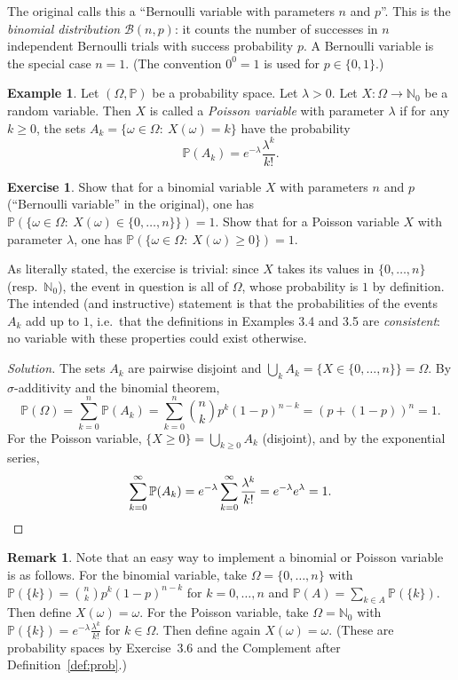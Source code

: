 \documentclass[11pt,a4paper]{article}
\numberwithin{equation}{section}
\newcommand{\N}{\mathbb{N}}
\newcommand{\PP}{\mathbb{P}}
\theoremstyle{plain}
\theoremstyle{definition}
\newtheorem{example}[theorem]{Example}
\newtheorem{exercise}[theorem]{Exercise}
\newtheorem{remark}[theorem]{Remark}
\theoremstyle{plain}
\theoremstyle{definition}
\newenvironment{solution}{\begin{proof}[Solution]}{\end{proof}}
\begin{document}
\begin{correction}[(Ex.~3.4)]
The original calls this a ``Bernoulli variable with parameters $n$ and $p$''. This is the
\emph{binomial distribution} $\mathcal B(n,p)$: it counts the number of successes in $n$
independent Bernoulli trials with success probability $p$. A Bernoulli variable is the
special case $n=1$. (The convention $0^0=1$ is used for $p\in\{0,1\}$.)
\end{correction}

\begin{example}
Let $(\Omega,\PP)$ be a probability space. Let $\lambda>0$. Let $X:\Omega\to\N_0$ be a
random variable. Then $X$ is called a \emph{Poisson variable} with parameter $\lambda$ if
for any $k\geqslant0$, the sets $A_k=\{\omega\in\Omega:\ X(\omega)=k\}$ have the probability
\[
\PP(A_k)=e^{-\lambda}\frac{\lambda^k}{k!}.
\]
\end{example}

\begin{exercise}
Show that for a binomial variable $X$ with parameters $n$ and $p$ (``Bernoulli variable'' in
the original), one has $\PP(\{\omega\in\Omega:\ X(\omega)\in\{0,\dots,n\}\})=1$.
Show that for a Poisson variable $X$ with parameter $\lambda$, one has
$\PP(\{\omega\in\Omega:\ X(\omega)\geqslant0\})=1$.
\end{exercise}

\begin{correction}[(Ex.~3.6)]
As literally stated, the exercise is trivial: since $X$ takes its values in $\{0,\dots,n\}$
(resp.\ $\N_0$), the event in question is all of $\Omega$, whose probability is $1$ by
definition. The intended (and instructive) statement is that the probabilities of the
events $A_k$ add up to $1$, i.e.\ that the definitions in Examples 3.4 and 3.5 are
\emph{consistent}: no variable with these properties could exist otherwise.
\end{correction}
\begin{solution}
The sets $A_k$ are pairwise disjoint and $\bigcup_kA_k=\{X\in\{0,\dots,n\}\}=\Omega$.
By $\sigma$-additivity and the binomial theorem,
\[
\PP(\Omega)=\sum_{k=0}^n\PP(A_k)=\sum_{k=0}^n\binom nkp^k(1-p)^{n-k}=(p+(1-p))^n=1 .
\]
For the Poisson variable, $\{X\ge0\}=\bigcup_{k\ge0}A_k$ (disjoint), and by the exponential series,
\[
\sum_{k=0}^\infty\PP(A_k)=e^{-\lambda}\sum_{k=0}^\infty\frac{\lambda^k}{k!}=e^{-\lambda}e^{\lambda}=1 .\qedhere
\]
\end{solution}

\begin{remark}
Note that an easy way to implement a binomial or Poisson variable is as follows. For the
binomial variable, take $\Omega=\{0,\dots,n\}$ with
$\PP(\{k\})=\binom nkp^k(1-p)^{n-k}$ for $k=0,\dots,n$ and $\PP(A)=\sum_{k\in A}\PP(\{k\})$.
Then define $X(\omega)=\omega$. For the Poisson variable, take $\Omega=\N_0$ with
$\PP(\{k\})=e^{-\lambda}\frac{\lambda^k}{k!}$ for $k\in\Omega$. Then define again
$X(\omega)=\omega$. (These are probability spaces by Exercise~3.6 and the Complement after
Definition~\ref{def:prob}.)
\end{remark}
\end{document}
